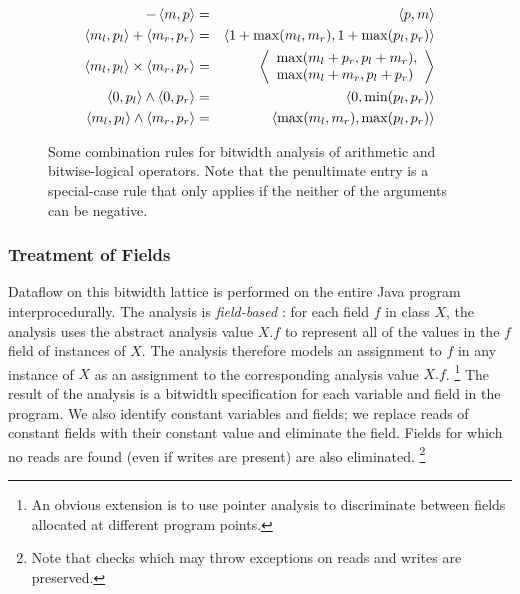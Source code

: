 \documentclass{sig-alt-full}
\begin{document}
\begin{figure}[tp]
\begin{eqnarray*}
-\left\langle m,p \right\rangle &=& \left\langle p,m \right\rangle\\
\left\langle m_l,p_l \right\rangle + \left\langle m_r,p_r \right\rangle &=& \left\langle 1+\max(m_l,m_r),1+\max(p_l,p_r) \right\rangle\\
\left\langle m_l,p_l \right\rangle \times \left\langle m_r,p_r \right\rangle &=&
\left\langle \begin{array}{l}\max(m_l+p_r,p_l+m_r),\\
                       \max(m_l+m_r,p_l+p_r)\end{array} \right\rangle\\
\left\langle 0,p_l \right\rangle \wedge \left\langle 0,p_r \right\rangle &=& \left\langle 0,\min(p_l,p_r) \right\rangle\\
\left\langle m_l,p_l \right\rangle\wedge \left\langle m_r,p_r \right\rangle &=& \left\langle \max(m_l,m_r),\max(p_l,p_r) \right\rangle
\end{eqnarray*}%
\caption{Some combination rules for bitwidth analysis of arithmetic
  and bitwise-logical operators.
  Note that the penultimate entry is a
  special-case rule that only applies if the neither of the
  arguments can be negative.
}\label{fig:bitrules}
\end{figure}

\subsubsection{Treatment of Fields}
Dataflow on this bitwidth lattice is performed on the entire Java
program interprocedurally.  The analysis is
{\it field-based} \cite{heintze01}: for each field $f$ in 
class $X$, the analysis uses the abstract analysis value $X.f$ to represent
all of the values in the $f$ field of instances of $X$. 
The analysis therefore models an assignment to $f$ in any instance of 
$X$ as an assignment to the corresponding analysis value $X.f$.%
\footnote{An obvious extension is to use pointer
analysis to discriminate between fields allocated at different
program points.}  The result of the analysis is a bitwidth
specification for each variable and field in the program.
We also identify constant variables and
fields; we replace reads of constant fields with their constant
value and eliminate the field.  Fields for which no reads are
found (even if writes are present) are also eliminated.%
\footnote{Note that checks which may throw exceptions on reads and
  writes are preserved.}
\end{document}
